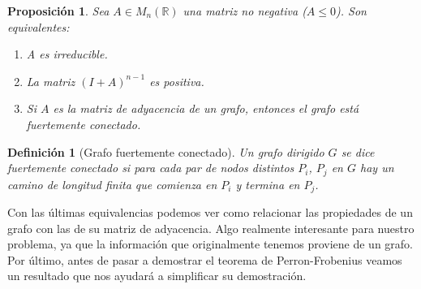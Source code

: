 \documentclass[size=a4, parskip=half, titlepage=false, toc=flat, toc=bib, 12pt, twoside]{scrartcl}
\theoremstyle{theorem-style}
\newtheorem{nprop}{Proposición}[section]
\theoremstyle{definition-style}
\newtheorem{ndef}{Definición}[section]
\theoremstyle{remark-style}
\theoremstyle{example-style}
\theoremstyle{definition-style}
\theoremstyle{remark-style}
\begin{document}
\begin{nprop}
\label{irreducible}
\label{positiva}
Sea $A \in M_n(\mathbb{R})$ una matriz no negativa ($A \leq 0$). Son equivalentes:
\begin{enumerate}
\item A es irreducible.
\item La matriz $(I + A)^{n - 1}$ es positiva.
\item Si $A$ es la matriz de adyacencia de un grafo, entonces el grafo está fuertemente conectado.
\end{enumerate}
\end{nprop}

\begin{ndef}[Grafo fuertemente conectado]
Un grafo dirigido $G$ se dice fuertemente conectado si para cada par de nodos distintos $P_i$, $P_j$ en $G$ hay un camino de longitud finita que comienza en $P_i$ y termina en $P_j$.
\end{ndef}

Con las últimas equivalencias podemos ver como relacionar las propiedades de un grafo con las de su matriz de adyacencia. Algo realmente interesante para nuestro problema, ya que la información que originalmente tenemos proviene de un grafo. Por último, antes de pasar a demostrar el teorema de Perron-Frobenius veamos un resultado que nos ayudará a simplificar su demostración.
\end{document}
